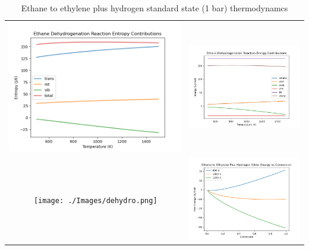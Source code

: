 \documentclass[11pt]{article}
\begin{document}
\begin{table}
   \caption{Ethane to ethylene plus hydrogen standard state (1 bar) thermodynamcs}
\begin{tabular}{cc}
\includegraphics[scale=0.5]{./Images/dehydro-entropy.png} & \includegraphics[scale=0.5]{./Images/dehydro-energy.png} \\ \texttt{[image: ./Images/dehydro.png]} & \includegraphics[scale=0.5]{./Images/dehydroG.png} \\

\end{tabular}
\end{table}
\end{document}
